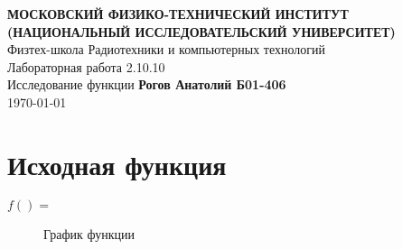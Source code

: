 \documentclass[12pt, letterpaper]{report}
\begin{document}
\begin{titlepage}
\begin{center}
\vspace*{1cm}
\textbf{МОСКОВСКИЙ ФИЗИКО-ТЕХНИЧЕСКИЙ ИНСТИТУТ (НАЦИОНАЛЬНЫЙ ИССЛЕДОВАТЕЛЬСКИЙ УНИВЕРСИТЕТ)}\\
\vspace{0.5cm} Физтех-школа Радиотехники и компьютерных технологий\\
\vspace{5cm} \LARGE{Лабораторная работа 2.10.10\\
Исследование функции}
\vfill
\large{\textbf{Рогов Анатолий Б01-406}} \\
\large \today
\vspace{0.8cm}
\end{center}
\end{titlepage}
\chapter{Исходная функция}
\hfil $f() = $\\
\begin{figure}[h]
\centering
{}
\caption{График функции}
\end{figure}
\end{document}
